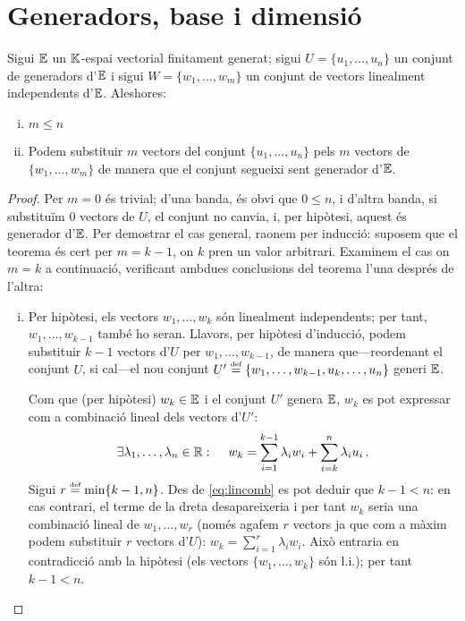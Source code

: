 \section{Generadors, base i dimensió}

\begin{specialteo}\label{teo:steinitz}
	Sigui $\mathbb{E}$ un $\mathbb{K}$-espai vectorial finitament generat; sigui $U = \{u_1,\dots, u_n\}$ un conjunt de generadors d'$\mathbb{E}$ i sigui $W = \{w_1,..., w_m\}$ un conjunt de vectors linealment independents d'$\mathbb{E}$. Aleshores:
	\begin{enumerate}[i)]
		\item $m \leq n$
		\item Podem substituir $m$ vectors del conjunt $\{u_1, ..., u_n\}$ pels $m$ vectors de $\{w_1,..., w_m\}$ de manera que el conjunt segueixi sent generador d'$\mathbb{E}$.
	\end{enumerate}	
	\begin{proof} 
		Per $m=0$ és trivial; d'una banda, és obvi que $0\le n$, i d'altra banda, si substituïm 0 vectors de $U$, el conjunt no canvia, i, per  hipòtesi, aquest és generador d'$\mathbb{E}$. Per demostrar el cas general, raonem per inducció: suposem que el teorema és cert per $m = k-1$, on $k$ pren un valor arbitrari. Examinem el cas on $m = k$ a continuació, verificant ambdues conclusions del teorema l'una després de l'altra:
		
		\begin{enumerate}[i)]
			\item Per hipòtesi, els vectors $w_1, \ldots, w_k$ són linealment independents; per tant, %
			$w_1, \ldots, w_{k-1}$ també ho seran. Llavors, per hipòtesi d'inducció, podem substituir $k-1$ vectors d'$U$ per $w_1, \ldots, w_{k-1}$, de manera que---reordenant el conjunt $U$, si cal---el nou conjunt ${U'\stackrel{\text{\tiny def}}{=} \{w_1, \ldots, w_{k-1}, u_k, \ldots, u_n\}}$ generi $\mathbb{E}$.
			
			Com que (per hipòtesi) $w_k\in\mathbb{E}$ i el conjunt $U'$ genera $\mathbb{E}$, $w_k$ es pot expressar com a combinació lineal dels vectors d'$U'$: 
			\begin{equation}\label{eq:lincomb}
				\exists \lambda_1,\ldots, \lambda_n \in \mathbb{R} \operatorname{\colon\quad} w_k = \sum_{i=1}^{k-1} \lambda_i w_i + \sum_{i = k}^{n} \lambda_i u_i\,.
			\end{equation}
			Sigui $r \stackrel{\text{\tiny def}}{=} \min \{k-1, n\}$. Des de \eqref{eq:lincomb} es pot deduir que $k-1 < n$: en cas contrari, el terme de la dreta desapareixeria i per tant $w_k$ seria una combinació lineal de $w_1, \ldots, w_r$ (només agafem $r$ vectors ja que com a màxim podem substituir $r$ vectors d'$U$): $w_k = \sum_{i=1}^{r} \lambda_iw_i$. Això entraria en contradicció amb la hipòtesi (els vectors $\{w_1, \ldots, w_k\}$ són l.i.); per tant $k-1 < n$.
			

\end{enumerate}
\end{proof}
\end{specialteo}

